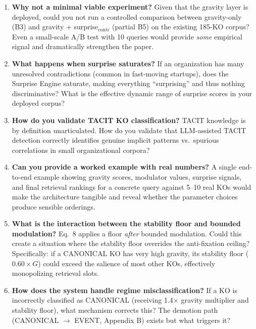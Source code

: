 \documentclass[11pt,a4paper]{article}
\begin{document}
\begin{enumerate}[label=\textbf{Q\arabic*.}, leftmargin=2em]

\item \textbf{Why not a minimal viable experiment?} Given that the gravity layer is deployed, could you not run a controlled comparison between gravity-only (B3) and gravity + surprise$_{\text{contr}}$ (partial B5) on the existing 185-KO corpus? Even a small-scale A/B test with 10 queries would provide \emph{some} empirical signal and dramatically strengthen the paper.

\item \textbf{What happens when surprise saturates?} If an organization has many unresolved contradictions (common in fast-moving startups), does the Surprise Engine saturate, making everything ``surprising'' and thus nothing discriminative? What is the effective dynamic range of surprise scores in your deployed corpus?

\item \textbf{How do you validate TACIT KO classification?} TACIT knowledge is by definition unarticulated. How do you validate that LLM-assisted TACIT detection correctly identifies genuine implicit patterns vs.\ spurious correlations in small organizational corpora?

\item \textbf{Can you provide a worked example with real numbers?} A single end-to-end example showing gravity scores, modulator values, surprise signals, and final retrieval rankings for a concrete query against 5--10 real KOs would make the architecture tangible and reveal whether the parameter choices produce sensible orderings.

\item \textbf{What is the interaction between the stability floor and bounded modulation?} Eq.~8 applies a floor \emph{after} bounded modulation. Could this create a situation where the stability floor overrides the anti-fixation ceiling? Specifically: if a CANONICAL KO has very high gravity, its stability floor ($0.60 \times G$) could exceed the salience of most other KOs, effectively monopolizing retrieval slots.

\item \textbf{How does the system handle regime misclassification?} If a KO is incorrectly classified as CANONICAL (receiving 1.4$\times$ gravity multiplier and stability floor), what mechanism corrects this? The demotion path (CANONICAL $\to$ EVENT, Appendix B) exists but what triggers it?

\end{enumerate}
\end{document}
